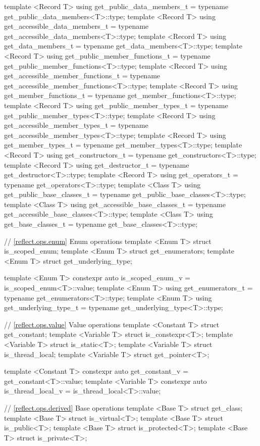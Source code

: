 \begin{std.txt}
\begin{codeblock}
{{template <Record T>
  using get_public_data_members_t = typename get_public_data_members<T>::type;
template <Record T>
  using get_accessible_data_members_t = typename get_accessible_data_members<T>::type;
template <Record T>
  using get_data_members_t = typename get_data_members<T>::type;
template <Record T>
  using get_public_member_functions_t = typename get_public_member_functions<T>::type;
template <Record T>
  using get_accessible_member_functions_t = typename get_accessible_member_functions<T>::type;
template <Record T>
  using get_member_functions_t = typename get_member_functions<T>::type;
template <Record T>
  using get_public_member_types_t = typename get_public_member_types<T>::type;
template <Record T>
  using get_accessible_member_types_t = typename get_accessible_member_types<T>::type;
template <Record T>
  using get_member_types_t = typename get_member_types<T>::type;
template <Record T>
  using get_constructors_t = typename get_constructors<T>::type;
template <Record T>
  using get_destructor_t = typename get_destructor<T>::type;
template <Record T>
  using get_operators_t = typename get_operators<T>::type;
template <Class T>
  using get_public_base_classes_t = typename get_public_base_classes<T>::type;
template <Class T>
  using get_accessible_base_classes_t = typename get_accessible_base_classes<T>::type;
template <Class T>
  using get_base_classes_t = typename get_base_classes<T>::type;

// \ref{reflect.ops.enum} Enum operations
template <Enum T> struct is_scoped_enum;
template <Enum T> struct get_enumerators;
template <Enum T> struct get_underlying_type;

template <Enum T>
  constexpr auto is_scoped_enum_v = is_scoped_enum<T>::value;
template <Enum T>
  using get_enumerators_t = typename get_enumerators<T>::type;
template <Enum T>
  using get_underlying_type_t = typename get_underlying_type<T>::type;

// \ref{reflect.ops.value} Value operations
template <Constant T> struct get_constant;
template <Variable T> struct is_constexpr<T>;
template <Variable T> struct is_static<T>;
template <Variable T> struct is_thread_local;
template <Variable T> struct get_pointer<T>;

template <Constant T>
  constexpr auto get_constant_v = get_constant<T>::value;
template <Variable T>
  constexpr auto is_thread_local_v = is_thread_local<T>::value;

// \ref{reflect.ops.derived} Base operations
template <Base T> struct get_class;
template <Base T> struct is_virtual<T>;
template <Base T> struct is_public<T>;
template <Base T> struct is_protected<T>;
template <Base T> struct is_private<T>;

}}
\end{codeblock}
\end{std.txt}
